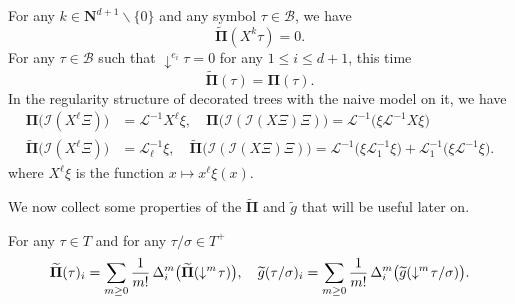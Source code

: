 \documentclass[11pt]{preprint}
\newcommand{\mcB}{\mathcal{B}}
\newcommand{\mcI}{\mathcal{I}}
\def\PPi{\boldsymbol{\Pi}}
\newcommand{\bfN}{\mathbf{N}}
\newcommand{\scrL}{\mathscr{L}}
\begin{document}
	\begin{example}
		For any $k\in\bfN^{d+1}\backslash \{ 0 \} $ and any symbol $\tau\in\mcB$, we have
		$$
		\widetilde{\PPi}(X^k\tau) = 0.
		$$
		For any $\tau\in\mcB$ such that $\downarrow^{e_i}\tau = 0$ for any $1\leq i \leq d+1$, this time
		$$
		\widetilde{\PPi}(\tau) = { \PPi}(\tau).
		$$
		In the regularity structure of decorated trees with the naive model on it, we have 
		\begin{align*}
			\PPi \big(\mcI(X^\ell\Xi)\big) &= \scrL^{-1} X^{\ell}\xi,
			\quad 
			\PPi \big(\mcI(\mcI(X\Xi)\Xi)\big) = \scrL^{-1}\big( \xi\scrL^{-1} X \xi\big) 
			\\
			\widetilde{\PPi}\big(\mcI(X^\ell\Xi)\big) &= \scrL_\ell^{-1}\xi,
			\quad 
			\widetilde{\PPi}\big(\mcI(\mcI(X\Xi)\Xi)\big) = \scrL^{-1}\big( \xi\scrL_1^{-1}\xi\big) +  \scrL_1^{-1}\big( \xi \scrL^{-1}\xi \big).
		\end{align*}
		where $ X^\ell \xi $ is the function $ x \mapsto x^{\ell} \xi(x) $.
	\end{example}
	We now collect some properties of the $\widetilde{\PPi}$ and $\widetilde{ g}$ that will be useful later on.
	\begin{lemma} \label{lem_gtildetogitilde}
		For any $\tau\in T$ and for any $\tau/\sigma\in T^+$
		\begin{equation}\label{eq_gitildefromdeltai}
			\widetilde{ \PPi}(\tau)_i = \sum_{m\geq 0} \frac{1}{m!} \, \Delta_i^m\big(\widetilde{ \PPi}(\downarrow^m\hspace{-2pt}\tau)\big),\quad 
			\widetilde{ g}(\tau/\sigma)_i = \sum_{m\geq 0} \frac{1}{m!} \, \Delta_i^m\big(\widetilde{ g}(\downarrow^m\hspace{-2pt}\tau/\sigma )\big).
		\end{equation}
	\end{lemma}
	
\end{document}
